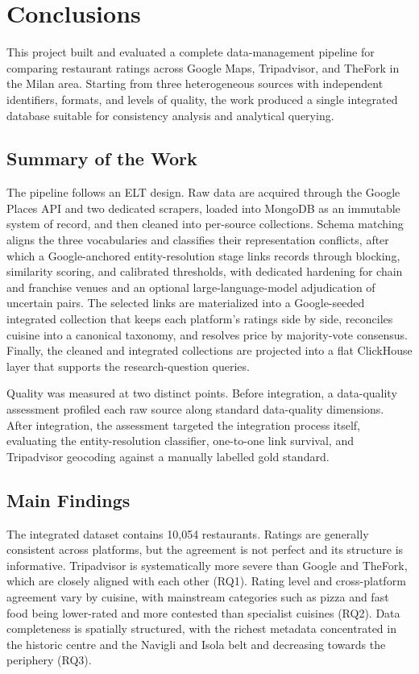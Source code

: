 \chapter{Conclusions}

This project built and evaluated a complete data-management pipeline for comparing
restaurant ratings across Google Maps, Tripadvisor, and TheFork in the Milan area.
Starting from three heterogeneous sources with independent identifiers, formats, and
levels of quality, the work produced a single integrated database suitable for
consistency analysis and analytical querying.

\section{Summary of the Work}

The pipeline follows an ELT design. Raw data are acquired through the Google Places
API and two dedicated scrapers, loaded into MongoDB as an immutable system of record,
and then cleaned into per-source collections. Schema matching aligns the three
vocabularies and classifies their representation conflicts, after which a
Google-anchored entity-resolution stage links records through blocking, similarity
scoring, and calibrated thresholds, with dedicated hardening for chain and franchise
venues and an optional large-language-model adjudication of uncertain pairs. The
selected links are materialized into a Google-seeded integrated collection that keeps
each platform's ratings side by side, reconciles cuisine into a canonical taxonomy,
and resolves price by majority-vote consensus. Finally, the cleaned and integrated
collections are projected into a flat ClickHouse layer that supports the
research-question queries.

Quality was measured at two distinct points. Before integration, a data-quality
assessment profiled each raw source along standard data-quality dimensions. After
integration, the assessment targeted the integration process itself, evaluating the
entity-resolution classifier, one-to-one link survival, and Tripadvisor geocoding
against a manually labelled gold standard.

\section{Main Findings}

The integrated dataset contains 10,054 restaurants. Ratings are generally consistent
across platforms, but the agreement is not perfect and its structure is informative.
Tripadvisor is systematically more severe than Google and TheFork, which are closely
aligned with each other (RQ1). Rating level and cross-platform agreement vary by
cuisine, with mainstream categories such as pizza and fast food being lower-rated and
more contested than specialist cuisines (RQ2). Data completeness is spatially
structured, with the richest metadata concentrated in the historic centre and the
Navigli and Isola belt and decreasing towards the periphery (RQ3).

